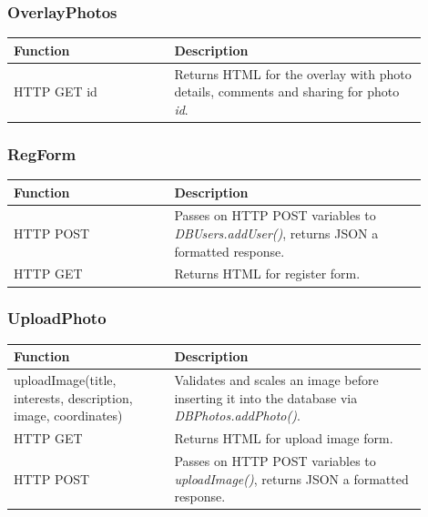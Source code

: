 \subsubsection{OverlayPhotos}
\begin{minipage}{\linewidth}
  \centering
  \setlength{\tabcolsep}{12pt}
  \begin{tabular}{|p{0.35\linewidth}|p{0.55\linewidth}|}
  \hline
  \cellcolor{gray!25} Function & \cellcolor{gray!25} Description \\
  \hline
  HTTP GET id & Returns HTML for the overlay with photo details, comments and sharing for photo \textit{id}. \\
  \hline
  \end{tabular}
\end{minipage}

\subsubsection{RegForm}
\begin{minipage}{\linewidth}
  \centering
  \setlength{\tabcolsep}{12pt}
  \begin{tabular}{|p{0.35\linewidth}|p{0.55\linewidth}|}
  \hline
  \cellcolor{gray!25} Function & \cellcolor{gray!25} Description \\
  \hline
  HTTP POST & Passes on HTTP POST variables to \textit{DBUsers.addUser()}, returns JSON a formatted response. \\
  HTTP GET & Returns HTML for register form. \\
  \hline
  \end{tabular}
\end{minipage}

\subsubsection{UploadPhoto}
\begin{minipage}{\linewidth}
  \centering
  \setlength{\tabcolsep}{12pt}
  \begin{tabular}{|p{0.35\linewidth}|p{0.55\linewidth}|}
  \hline
  \cellcolor{gray!25} Function & \cellcolor{gray!25} Description \\
  \hline
  uploadImage(title, interests, description, image, coordinates) & Validates and scales an image before inserting it into the database via \textit{DBPhotos.addPhoto()}. \\
  HTTP GET & Returns HTML for upload image form. \\
  HTTP POST & Passes on HTTP POST variables to \textit{uploadImage()}, returns JSON a formatted response. \\
  \hline
  \end{tabular}
\end{minipage}

